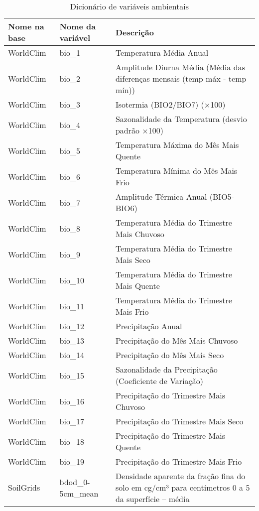 \begin{longtable}{@{} p{4cm} p{4cm} p{8cm} @{}} 
	\caption{Dicionário de variáveis ambientais}
	\label{tab:dicionarioambientais} \\
	\toprule
	\textbf{Nome na base} & \textbf{Nome da variável} & \textbf{Descrição} \\ \midrule
	\endfirsthead
	\endhead
	\bottomrule
	\endfoot
	\endlastfoot
	WorldClim &
	bio\_1 &
	Temperatura Média Anual \\
	WorldClim &
	bio\_2 &
	Amplitude Diurna Média (Média das diferenças mensais (temp máx - temp mín)) \\
	WorldClim &
	bio\_3 &
	Isotermia (BIO2/BIO7) (×100) \\
	WorldClim &
	bio\_4 &
	Sazonalidade da Temperatura (desvio padrão ×100) \\
	WorldClim &
	bio\_5 &
	Temperatura Máxima do Mês Mais Quente \\
	WorldClim &
	bio\_6 &
	Temperatura Mínima do Mês Mais Frio \\
	WorldClim &
	bio\_7 &
	Amplitude Térmica Anual (BIO5-BIO6) \\
	WorldClim &
	bio\_8 &
	Temperatura Média do Trimestre Mais Chuvoso \\
	WorldClim &
	bio\_9 &
	Temperatura Média do Trimestre Mais Seco \\
	WorldClim &
	bio\_10 &
	Temperatura Média do Trimestre Mais Quente \\
	WorldClim &
	bio\_11 &
	Temperatura Média do Trimestre Mais Frio \\
	WorldClim &
	bio\_12 &
	Precipitação Anual \\
	WorldClim &
	bio\_13 &
	Precipitação do Mês Mais Chuvoso \\
	WorldClim &
	bio\_14 &
	Precipitação do Mês Mais Seco \\
	WorldClim &
	bio\_15 &
	Sazonalidade da Precipitação (Coeficiente de Variação) \\
	WorldClim &
	bio\_16 &
	Precipitação do Trimestre Mais Chuvoso \\
	WorldClim &
	bio\_17 &
	Precipitação do Trimestre Mais Seco \\
	WorldClim &
	bio\_18 &
	Precipitação do Trimestre Mais Quente \\
	WorldClim &
	bio\_19 &
	Precipitação do Trimestre Mais Frio \\
	SoilGrids &
	bdod\_0-5cm\_mean &
	Densidade aparente da fração fina do solo em cg/cm³ para centímetros 0 a 5 da superfície – média \\

\end{longtable}
